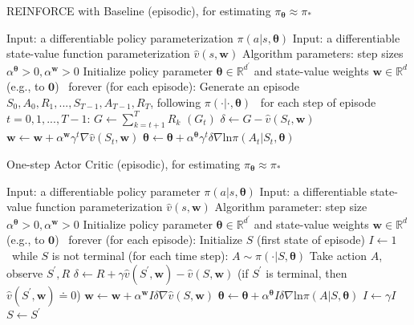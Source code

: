 \documentclass[12pt,a4paper]{article}
\begin{document}
\newpage

\begin{algorithm}
\caption{REINFORCE with Baseline (episodic), for estimating $\pi_{\bm{\theta}} \approx \pi_{*}$}
\begin{algorithmic}
	\State Input: a differentiable policy parameterization $\pi(a|s, \bm{\theta})$
	\State Input: a differentiable state-value function parameterization $\hat{v}(s, \mathbf{w})$
	\State Algorithm parameters: step sizes $\alpha^{\bm{\theta}} > 0, \alpha^{\mathbf{w}} > 0$
	\State Initialize policy parameter $\bm{\theta} \in \mathbb{R}^{d^{'}}$ and state-value weights $\mathbf{w} \in \mathbb{R}^{d}$ (e.g., to $\mathbf{0}$)
	\State
	\Loop\ forever (for each episode):
		\State Generate an episode $S_0, A_0, R_1,..., S_{T-1}, A_{T-1}, R_{T}$, following $\pi(\cdot|\cdot, \bm{\theta})$
		\Loop\ for each step of episode $t=0,1,...,T-1$:
			\State $G \leftarrow \sum_{k=t+1}^{T}R_{k}$  \qquad $(G_t)$
			\State $\delta \leftarrow G - \hat{v}(S_{t}, \mathbf{w})$
			\State $\mathbf{w} \leftarrow \mathbf{w} + \alpha^{\mathbf{w}}\gamma^{t}\nabla\hat{v}(S_{t}, \mathbf{w})$
			\State $\bm{\theta} \leftarrow \bm{\theta} + \alpha^{\bm{\theta}}\gamma^{t}\delta\nabla\text{ln}\pi(A_t|S_{t},\bm{\theta})$
		\EndLoop
	
	\EndLoop
\end{algorithmic}
\end{algorithm}

\newpage

\begin{algorithm}
\caption{One-step Actor Critic (episodic), for estimating $\pi_{\bm{\theta}} \approx \pi_{*}$}
\begin{algorithmic}
	\State Input: a differentiable policy parameter $\pi(a|s, \bm{\theta})$
	\State Input: a differentiable state-value function parameterization $\hat{v}(s, \mathbf{w})$
	\State Algorithm parameter: step size $\alpha^{\bm{\theta}} > 0, \alpha^{\mathbf{w}} > 0$
	\State Initialize policy parameter $\bm{\theta} \in \mathbb{R}^{d^{'}}$ and state-value weights $\mathbf{w} \in \mathbb{R}^{d}$ (e.g., to $\mathbf{0}$)
	\State
	\Loop\ forever (for each episode):
		\State Initialize $S$ (first state of episode)
		\State $I \leftarrow 1$
		\Loop\ while $S$ is not terminal (for each time step):
			\State $A \sim \pi(\cdot|S, \bm{\theta})$
			\State Take action $A$, observe $S^{'}, R$
			\State $\delta \leftarrow R + \gamma\hat{v}(S^{'}, \mathbf{w}) - \hat{v}(S,\mathbf{w})$    \qquad (if $S^{'}$ is terminal, then $\hat{v}(S^{'}, \mathbf{w}) \doteq 0$)
			\State $\mathbf{w} \leftarrow \mathbf{w} + \alpha^{\mathbf{w}}I\delta\nabla\hat{v}(S,\mathbf{w})$
			\State $\bm{\theta} \leftarrow \bm{\theta} + \alpha^{\bm{\theta}}I\delta\nabla\text{ln}\pi(A|S,\bm{\theta})$
			\State $I \leftarrow \gamma I$
			\State $S \leftarrow S^{'}$
		\EndLoop
	\EndLoop
	
\end{algorithmic}
\end{algorithm}
\end{document}
